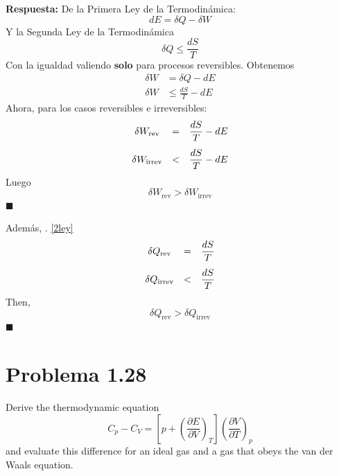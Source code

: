 \documentclass[]{article}
\numberwithin{equation}{section}
\newcommand{\0}{\textcolor{gray}{0}}
\newcommand{\deriv}[3]{\left(\frac{\partial #1}{\partial #2} \right)_{#3}}
\newcommand{\qed}{\hfill\(\blacksquare\)}
\begin{document}
\textbf{Respuesta:} 
De la Primera Ley de la Termodinámica:
\begin{equation}
	dE = \delta Q - \delta W \label{1ley}
\end{equation}
Y la Segunda Ley de la Termodinámica
\begin{equation}
	\delta Q \leq \frac{dS}{T} \label{2ley}
\end{equation}
Con la igualdad valiendo \textbf{solo} para procesos reversibles. Obtenemos
\begin{align*}
	\delta W &= \delta Q - dE\\
	\delta W &\leq \frac{dS}{T} - dE
\end{align*}
Ahora, para los casos reversibles e irreversibles:
\begin{equation*}
	\begin{matrix}
		\delta W_{\mathrm{rev}}   &=&    \dfrac{dS}{T} - dE\vspace{3mm}\\
		\delta W_{\mathrm{irrev}} &<& \dfrac{dS}{T} - dE
	\end{matrix}
\end{equation*}
Luego
\begin{equation*}
	\delta W_{\mathrm{rev}} > \delta W_{\mathrm{irrev}}
\end{equation*}
\qed

Además, . \ref{2ley}
\begin{equation*}
	\begin{matrix}
		\delta Q_{\mathrm{rev}} &=& \dfrac{dS}{T} \vspace{3mm}\\
		\delta Q_{\mathrm{irrev}} &<& \dfrac{dS}{T}
	\end{matrix}
\end{equation*}
Then,
\begin{equation*}
	\delta Q_{\mathrm{rev}} > \delta Q_{\mathrm{irrev}}
\end{equation*}
\qed

\section{Problema 1.28}
Derive the thermodynamic equation
\begin{equation}	
	C_p - C_V = \left[p+\deriv{E}{V}{T}\right]\deriv{V}{T}{p}
\end{equation}
and evaluate this difference for an ideal gas and a gas that obeys the van der Waals equation.
\\
\end{document}
